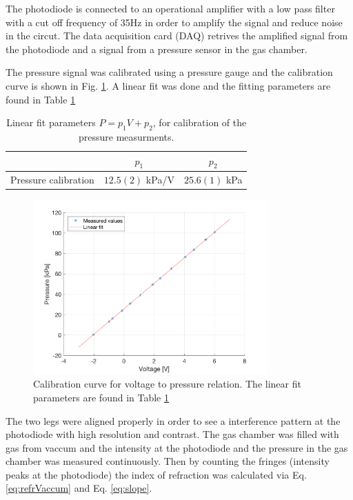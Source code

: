 The photodiode is connected to an operational amplifier with a low pass filter with a cut off frequency of 35Hz in order to amplify the signal and reduce noise in the circut. The data acquisition card (DAQ) retrives the amplified signal from the photodiode and a signal from a pressure sensor in the gas chamber.

The pressure signal was calibrated using a pressure gauge and the calibration curve is shown in Fig. \ref{fig:calibration}. A linear fit was done and the fitting parameters are found in Table \ref{tab:calibration}

\begin{table}[H]
\centering
  \caption{Linear fit parameters $P = p_1 V + p_2$, for calibration of the pressure measurments.}
  \label{tab:calibration}
  \begin{tabular}{c|cc}
    & $p_1$ & $p_2$ \\ \hline
    Pressure calibration & $12.5(2)$ kPa/V & $25.6(1)$ kPa
  \end{tabular}
\end{table}

\begin{figure}[H]
  \centering
  \includegraphics[width=0.8\textwidth]{matlab/calibration.png}
  \caption{Calibration curve for voltage to pressure relation. The linear fit parameters are found in Table \ref{tab:calibration}}
  \label{fig:calibration}
\end{figure}

The two legs were aligned properly in order to see a interference pattern at the photodiode with high resolution and contrast. The gas chamber was filled with gas from vaccum and the intensity at the photodiode and the pressure in the gas chamber was measured continuously. Then by counting the fringes (intensity peaks at the photodiode) the index of refraction was calculated via Eq. \ref{eq:refrVaccum} and Eq. \ref{eq:slope}.

